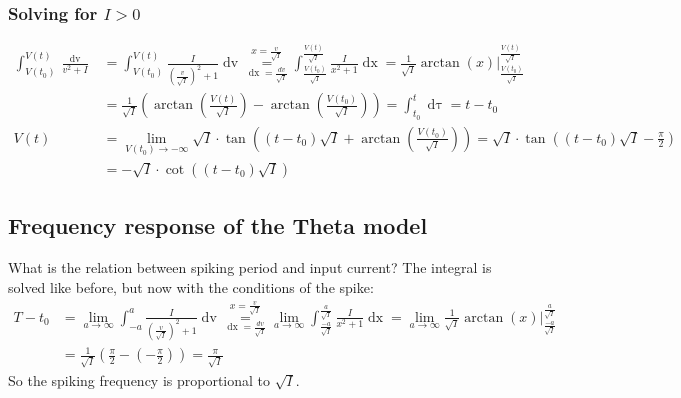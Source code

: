 \subsubsection{Solving for \texorpdfstring{$I > 0$}{TEXT}}
\begin{align*}
\int_{V(t_0)}^{V(t)} \frac{\mathop{dv}}{v^2 + I} &= \int_{V(t_0)}^{V(t)} \frac{I}{\left(\frac{v}{\sqrt{I}}\right)^2 + 1} \mathop{dv} 
\overset{x = \frac{v}{\sqrt{I}}}{\underset{\mathop{dx} = \frac{dv}{\sqrt{I}}}{=}} 
\int_{\frac{V(t_0)}{\sqrt{I}}}^{\frac{V(t)}{\sqrt{I}}} \frac{I}{x^2 + 1} \mathop{dx}= \frac{1}{\sqrt{I}} \arctan(x) \Big \rvert_{\frac{V(t_0)}{\sqrt{I}}}^{\frac{V(t)}{\sqrt{I}}} \\
&= \frac{1}{\sqrt{I}} \left( \arctan \left( \frac{V(t)}{\sqrt{I}} \right) - \arctan \left( \frac{V(t_0)}{\sqrt{I}} \right) \right) = 
\int_{t_0}^t \mathop{d\tau} = t - t_0 \\
V(t) &= \lim_{V(t_0) \rightarrow -\infty} \sqrt{I} \cdot \tan \left( (t - t_0) \sqrt{I} + \arctan \left( \frac{V(t_0)}{\sqrt{I}} \right) \right) = \sqrt{I} \cdot \tan \left( (t - t_0) \sqrt{I} - \frac{\pi}{2} \right) \\
&=  -\sqrt{I} \cdot \cot \left( (t - t_0) \sqrt{I} \right) 
\end{align*}


\subsection{Frequency response of the Theta model} \label{app:ThetaModelFrequencyResponse}
What is the relation between spiking period and input current? The integral is solved like before, but now with the conditions of the spike:
\begin{align*}
T - t_0&= \lim_{a \rightarrow \infty} \int_{-a}^{a} \frac{I}{\left(\frac{v}{\sqrt{I}}\right)^2 + 1} \mathop{dv} 
\overset{x = \frac{v}{\sqrt{I}}}{\underset{\mathop{dx} = \frac{dv}{\sqrt{I}}}{=}} 
\lim_{a \rightarrow \infty} \int_{\frac{-a}{\sqrt{I}}}^{\frac{a}{\sqrt{I}}} \frac{I}{x^2 + 1} \mathop{dx}
= \lim_{a \rightarrow \infty} \frac{1}{\sqrt{I}} \arctan(x) \Big \rvert_{\frac{-a}{\sqrt{I}}}^{\frac{a}{\sqrt{I}}} \\
&= \frac{1}{\sqrt{I}} \left( \frac{\pi}{2} - \left( - \frac{\pi}{2} \right) \right)
= \frac{\pi}{\sqrt{I}}
\end{align*}
So the spiking frequency is proportional to $\sqrt{I}$. 


